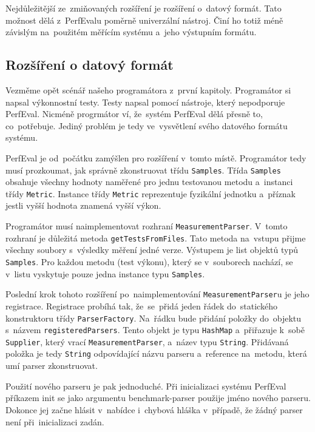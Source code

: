 Nejdůležitější ze~zmiňovaných rozšíření je rozšíření o~datový formát. Tato možnost dělá z~PerfEvalu
poměrně univerzální nástroj. Činí ho totiž méně závislým na~použitém měřícím systému a~jeho výstupním formátu.

\subsection{Rozšíření o datový formát}

Vezměme opět scénář našeho programátora z~první kapitoly. Programátor si napsal výkonnostní testy.
Testy napsal pomocí nástroje, který nepodporuje PerfEval. Nicméně progrmátor ví, že~systém PerfEval
dělá přesně to, co~potřebuje. Jediný problém je tedy ve~vysvětlení svého datového formátu systému.

PerfEval je od~počátku zamýšlen pro rozšíření v~tomto místě. Programátor tedy musí prozkoumat, jak správně zkonstruovat
třídu \lstinline{Samples}. Třída \lstinline{Samples} obsahuje všechny hodnoty naměřené pro jednu testovanou metodu a~instanci
třídy \lstinline{Metric}. Instance třídy \lstinline{Metric} reprezentuje fyzikální jednotku a~příznak jestli vyšší hodnota
znamená vyšší výkon.

Programátor musí naimplementovat rozhraní \lstinline{MeasurementParser}. V~tomto rozhraní je důležitá metoda
\lstinline{getTestsFromFiles}. Tato metoda na~vstupu přijme všechny soubory s~výsledky měření jedné verze. Výstupem je list objektů
typů \lstinline{Samples}. Pro každou metodu (test výkonu), který se v~souborech nachází, se v~listu vyskytuje pouze jedna instance
typu \lstinline{Samples}.

Poslední krok tohoto rozšíření po~naimplementování \lstinline{MeasurementParser}u je jeho registrace. Registrace probíhá tak,
že~se~přidá jeden řádek do~statického konstruktoru třídy \lstinline{ParserFactory}. Na~řádku bude přidání položky do~objektu
s~názvem \lstinline{registeredParsers}. Tento objekt je typu \lstinline{HashMap} a~přiřazuje k~sobě \lstinline{Supplier}, který vrací \lstinline{MeasurementParser},
a~název typu \lstinline{String}. Přidávaná položka je tedy \lstinline{String} odpovídající názvu parseru a~reference na~metodu,
která umí parser zkonstruovat.

Použití nového parseru je pak jednoduché. Při inicializaci systému PerfEval příkazem init se jako argumentu
benchmark-parser použije jméno nového parseru. Dokonce jej začne hlásit v~nabídce i~chybová hláška v~případě, že žádný parser
není při~inicializaci zadán.

